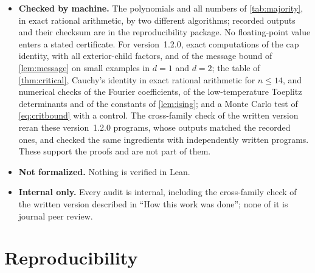 \documentclass[11pt]{article}
\theoremstyle{plain}
\theoremstyle{definition}
\theoremstyle{remark}
\begin{document}
\begin{itemize}
\item \textbf{Checked by machine.} The polynomials and all numbers of \cref{tab:majority}, in exact rational arithmetic, by two different algorithms; recorded outputs and their checksum are in the reproducibility package. No floating-point value enters a stated certificate. For version~1.2.0, exact computations of the cap identity, with all exterior-child factors, and of the message bound of \cref{lem:message} on small examples in $d=1$ and $d=2$; the table of \cref{thm:critical}, Cauchy's identity in exact rational arithmetic for $n\le14$, and numerical checks of the Fourier coefficients, of the low-temperature Toeplitz determinants and of the constants of \cref{lem:ising}; and a Monte Carlo test of \eqref{eq:critbound} with a control. The cross-family check of the written version reran these version~1.2.0 programs, whose outputs matched the recorded ones, and checked the same ingredients with independently written programs. These support the proofs and are not part of them.
\item \textbf{Not formalized.} Nothing is verified in Lean.
\item \textbf{Internal only.} Every audit is internal, including the cross-family check of the written version described in ``How this work was done''; none of it is journal peer review.
\end{itemize}

\appendix
\section{Reproducibility}
\label{app:repro}
\end{document}
